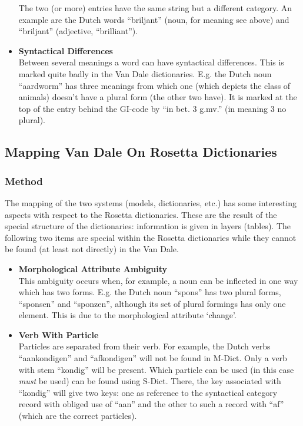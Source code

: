 \begin{itemize}
        The two (or more) entries have the same string but a different category.
        An example are the Dutch words ``briljant'' (noun, for meaning see 
        above) and ``briljant'' (adjective, ``brilliant''). 
  \item {\bf Syntactical Differences}\\
        Between several meanings a word can have syntactical differences.
        This is marked quite badly in the Van Dale dictionaries. E.g. the Dutch
        noun ``aardworm'' has three meanings from which one (which depicts the 
        class of animals) doesn't have a plural form (the other two have).
        It is marked at the top of the entry behind the GI-code by 
        ``in bet. 3 g.mv.'' (in meaning 3 no plural).
\end{itemize}

\subsection{Mapping Van Dale On Rosetta Dictionaries}

\subsubsection{Method}

The mapping of the two systems (models, dictionaries, etc.) has some
interesting aspects with respect to the Rosetta dictionaries. These are the
result of the special structure of the dictionaries: information is given in
layers (tables). The following two items are special within the Rosetta 
dictionaries while they cannot be found (at least not directly) in the Van Dale.

\begin{itemize}
  \item {\bf Morphological Attribute Ambiguity}\\
        This ambiguity occurs when, for example, a noun can be inflected in 
        one way which has two forms. E.g. the Dutch noun ``spons'' has two 
        plural forms, ``sponsen'' and ``sponzen'', although its set of plural
        formings has only one element. This is due to the morphological 
        attribute `change'.
  \item {\bf Verb With Particle}\\
        Particles are separated from their verb. For example, the Dutch verbs
        ``aankondigen'' and ``afkondigen'' will not be found in M-Dict. Only
        a verb with stem ``kondig'' will be present. Which particle can be used 
        (in this case {\em must} be used) can be found using S-Dict. There, the 
        key associated with ``kondig'' will give two keys: one as reference to 
        the syntactical category record with obliged use of ``aan'' and the
        other to such a record with ``af'' (which are the correct particles).
\end{itemize}

